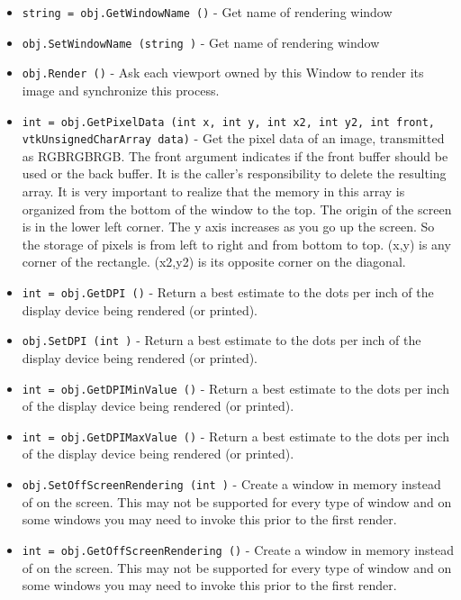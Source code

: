 \begin{itemize}
\item  \verb|string = obj.GetWindowName ()| -  Get name of rendering window

\item  \verb|obj.SetWindowName (string )| -  Get name of rendering window

\item  \verb|obj.Render ()| -  Ask each viewport owned by this Window to render its image and 
 synchronize this process.

\item  \verb|int = obj.GetPixelData (int x, int y, int x2, int y2, int front, vtkUnsignedCharArray data)| -  Get the pixel data of an image, transmitted as RGBRGBRGB. The
 front argument indicates if the front buffer should be used or the back 
 buffer. It is the caller's responsibility to delete the resulting 
 array. It is very important to realize that the memory in this array
 is organized from the bottom of the window to the top. The origin
 of the screen is in the lower left corner. The y axis increases as
 you go up the screen. So the storage of pixels is from left to right
 and from bottom to top.
 (x,y) is any corner of the rectangle. (x2,y2) is its opposite corner on
 the diagonal.

\item  \verb|int = obj.GetDPI ()| -  Return a best estimate to the dots per inch of the display
 device being rendered (or printed).

\item  \verb|obj.SetDPI (int )| -  Return a best estimate to the dots per inch of the display
 device being rendered (or printed).

\item  \verb|int = obj.GetDPIMinValue ()| -  Return a best estimate to the dots per inch of the display
 device being rendered (or printed).

\item  \verb|int = obj.GetDPIMaxValue ()| -  Return a best estimate to the dots per inch of the display
 device being rendered (or printed).

\item  \verb|obj.SetOffScreenRendering (int )| -  Create a window in memory instead of on the screen. This may not be
 supported for every type of window and on some windows you may need to
 invoke this prior to the first render.

\item  \verb|int = obj.GetOffScreenRendering ()| -  Create a window in memory instead of on the screen. This may not be
 supported for every type of window and on some windows you may need to
 invoke this prior to the first render.


\end{itemize}

